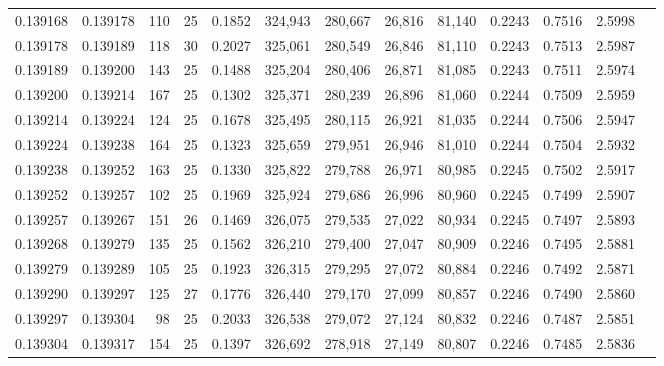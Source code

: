 \begin{tabular}{rrrrrrrrrrrrr}
0.139168 & 0.139178 &   110 &  25 &                                     0.1852 & 324,943 & 280,667 &  26,816 &  81,140 & 0.2243 & 0.7516 & 2.5998 \\
0.139178 & 0.139189 &   118 &  30 &                                     0.2027 & 325,061 & 280,549 &  26,846 &  81,110 & 0.2243 & 0.7513 & 2.5987 \\
0.139189 & 0.139200 &   143 &  25 &                                     0.1488 & 325,204 & 280,406 &  26,871 &  81,085 & 0.2243 & 0.7511 & 2.5974 \\
0.139200 & 0.139214 &   167 &  25 &                                     0.1302 & 325,371 & 280,239 &  26,896 &  81,060 & 0.2244 & 0.7509 & 2.5959 \\
0.139214 & 0.139224 &   124 &  25 &                                     0.1678 & 325,495 & 280,115 &  26,921 &  81,035 & 0.2244 & 0.7506 & 2.5947 \\
0.139224 & 0.139238 &   164 &  25 &                                     0.1323 & 325,659 & 279,951 &  26,946 &  81,010 & 0.2244 & 0.7504 & 2.5932 \\
0.139238 & 0.139252 &   163 &  25 &                                     0.1330 & 325,822 & 279,788 &  26,971 &  80,985 & 0.2245 & 0.7502 & 2.5917 \\
0.139252 & 0.139257 &   102 &  25 &                                     0.1969 & 325,924 & 279,686 &  26,996 &  80,960 & 0.2245 & 0.7499 & 2.5907 \\
0.139257 & 0.139267 &   151 &  26 &                                     0.1469 & 326,075 & 279,535 &  27,022 &  80,934 & 0.2245 & 0.7497 & 2.5893 \\
0.139268 & 0.139279 &   135 &  25 &                                     0.1562 & 326,210 & 279,400 &  27,047 &  80,909 & 0.2246 & 0.7495 & 2.5881 \\
0.139279 & 0.139289 &   105 &  25 &                                     0.1923 & 326,315 & 279,295 &  27,072 &  80,884 & 0.2246 & 0.7492 & 2.5871 \\
0.139290 & 0.139297 &   125 &  27 &                                     0.1776 & 326,440 & 279,170 &  27,099 &  80,857 & 0.2246 & 0.7490 & 2.5860 \\
0.139297 & 0.139304 &    98 &  25 &                                     0.2033 & 326,538 & 279,072 &  27,124 &  80,832 & 0.2246 & 0.7487 & 2.5851 \\
0.139304 & 0.139317 &   154 &  25 &                                     0.1397 & 326,692 & 278,918 &  27,149 &  80,807 & 0.2246 & 0.7485 & 2.5836 \\

\end{tabular}
